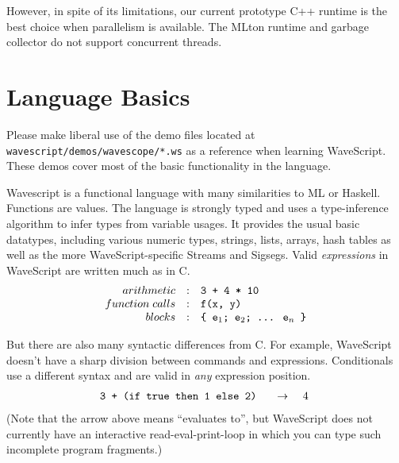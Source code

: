 \documentclass[twocolumn]{report}
\newcommand{\evalsto}[2]{\[ \begin{array}{rcl}
$\tt #1 $&$ \arr $&$ #2 $
\end{array} \]}
\newcommand{\arr}{\ensuremath{\rightarrow}}
\newcommand{\ws}{WaveScript}
\begin{document}

However, in spite of its limitations, our current prototype C++
runtime is the best choice when parallelism is available.  The MLton
runtime and garbage collector do not support concurrent threads.




\chapter{Language Basics}\label{s:lang}

Please make liberal use of the demo files located at {\tt wavescript/demos/wavescope/*.ws} as a reference
when learning WaveScript.  These demos cover most of the basic
functionality in the language.


Wavescript is a functional language with many similarities to ML or
Haskell.  Functions are values.  The language is strongly typed and uses a
type-inference algorithm to infer types from variable usages.
It provides the usual basic datatypes, including various
numeric types, strings, lists, arrays, hash tables as well as the more
WaveScript-specific Streams and Sigsegs.  Valid {\em expressions} in
WaveScript are written much as in C.
\[
\begin{array}{rcl}
arithmetic       & : & $\tt 3 + 4 * 10 $  \\
function\; calls & : & $\tt f(x, y)$  \\
blocks           & : & $\tt \{ e$_1$; e$_2$; \ldots$\:$ e$_n$ \}$  \\
\end{array}
\]

But there are also many syntactic differences from C.  For example,
WaveScript doesn't have a sharp division between commands and
expressions.  Conditionals use a different syntax and are valid in
{\em any}
expression position.
%
\evalsto{3 + (if true then 1 else 2)} {4}
%
(Note that the arrow above means ``evaluates to'', but {\ws} does not
currently have an interactive read-eval-print-loop in which you can
type such incomplete program fragments.)
\end{document}
